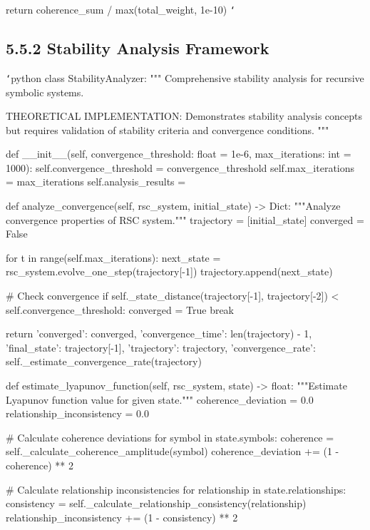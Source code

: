         return coherence_sum / max(total_weight, 1e-10)
\texttt{`}

\subsection{5.5.2 Stability Analysis Framework}

\texttt{`}python
class StabilityAnalyzer:
    """
    Comprehensive stability analysis for recursive symbolic systems.
    
    THEORETICAL IMPLEMENTATION: Demonstrates stability analysis concepts
    but requires validation of stability criteria and convergence conditions.
    """
    
    def __init__(self, convergence_threshold: float = 1e-6, max_iterations: int = 1000):
        self.convergence_threshold = convergence_threshold
        self.max_iterations = max_iterations
        self.analysis_results = {}
        
    def analyze_convergence(self, rsc_system, initial_state) -> Dict:
        """Analyze convergence properties of RSC system."""
        trajectory = [initial_state]
        converged = False
        
        for t in range(self.max_iterations):
            next_state = rsc_system.evolve_one_step(trajectory[-1])
            trajectory.append(next_state)
            
            \# Check convergence
            if self._state_distance(trajectory[-1], trajectory[-2]) < self.convergence_threshold:
                converged = True
                break
                
        return {
            'converged': converged,
            'convergence_time': len(trajectory) - 1,
            'final_state': trajectory[-1],
            'trajectory': trajectory,
            'convergence_rate': self._estimate_convergence_rate(trajectory)
        }
        
    def estimate_lyapunov_function(self, rsc_system, state) -> float:
        """Estimate Lyapunov function value for given state."""
        coherence_deviation = 0.0
        relationship_inconsistency = 0.0
        
        \# Calculate coherence deviations
        for symbol in state.symbols:
            coherence = self._calculate_coherence_amplitude(symbol)
            coherence_deviation += (1 - coherence) ** 2
            
        \# Calculate relationship inconsistencies
        for relationship in state.relationships:
            consistency = self._calculate_relationship_consistency(relationship)
            relationship_inconsistency += (1 - consistency) ** 2
            

